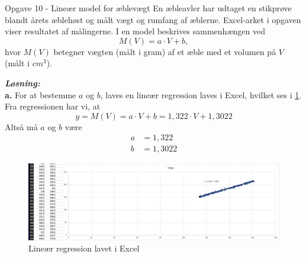 \documentclass{article}
\newcommand{\sol}{\setlength{\parindent}{0cm}\textbf{\textit{Løsning:}}\setlength{\parindent}{1cm}}
\begin{document}
\begin{question}{Opgave 10 - Lineær model for æblevægt}{}
  En æbleavler har udtaget en stikprøve blandt årets æblehøst og målt vægt og rumfang af æblerne.
  Excel-arket i opgaven viser resultatet af målingerne.
  I en model beskrives sammenhængen ved 
  \[
  M(V)=a \cdot V + b,
  \] 
  hvor $M(V)$ betegner vægten (målt i gram) af et æble med et volumen på $V$ (målt i $\unit{cm^3}$).
\end{question}
\sol \\
\textbf{a.}
For at bestemme $a$ og $b$, laves en lineær regression laves i Excel, hvilket ses i \cref{fig:Excel}.
Fra regressionen har vi, at 
\[
y=M(V)=a \cdot V + b =1,322 \cdot V + 1,3022
\] 
Altså må $a$ og $b$ være 
\begin{equation*}
\begin{split}
  a&=1,322\\
  b&=1,3022
\end{split}
\end{equation*}
\begin{figure}[H]
\begin{center}
  \includegraphics[width=\textwidth]{Excel.png }
\end{center}
\caption{Lineær regression lavet i Excel}
\label{fig:Excel}
\end{figure}
\end{document}
